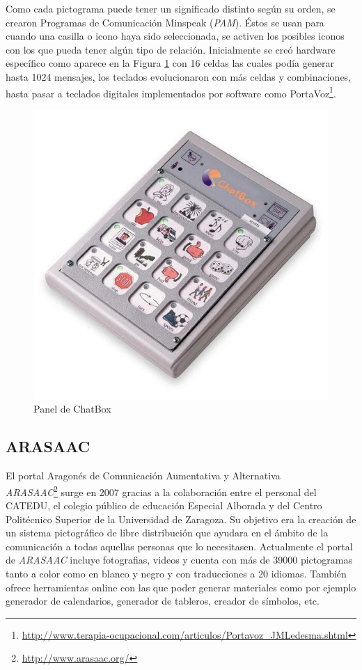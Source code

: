 Como cada pictograma puede tener un significado distinto según su orden, se crearon Programas de Comunicación Minspeak (\textit{PAM}). Éstos se usan para cuando una casilla o icono haya sido seleccionada, se activen los posibles iconos con los que pueda tener algún tipo de relación. Inicialmente se creó hardware específico como aparece en la Figura \ref{fig:chatbox} con 16 celdas las cuales podía generar hasta 1024 mensajes, los teclados evolucionaron con más celdas y combinaciones, hasta pasar a teclados digitales implementados por software como PortaVoz\footnote{\url{http://www.terapia-ocupacional.com/articulos/Portavoz_JMLedesma.shtml}}.

\begin{figure}[h!]
	\centering
	\includegraphics[width=0.4\linewidth]{Imagenes/Bitmap/ChatBox}
	\caption[ChatBox]{Panel de ChatBox}
	\label{fig:chatbox}
\end{figure}



\subsection{ARASAAC}

El portal Aragonés de Comunicación Aumentativa y Alternativa \\ \textit{ARASAAC}\footnote{\url{http://www.arasaac.org/}}
 surge en 2007 gracias a la colaboración entre el personal del CATEDU, el colegio público de educación Especial Alborada y del Centro Politécnico Superior de la Universidad de Zaragoza. Su objetivo era la creación de un sistema pictográfico de libre distribución que ayudara en el ámbito de la comunicación a todas aquellas personas que lo necesitasen.
Actualmente el portal de \textit{ARASAAC} incluye fotografias, videos y cuenta con más de 39000 pictogramas tanto a color como en blanco y negro y con traducciones a 20 idiomas. También ofrece herramientas online con las que poder generar materiales como por ejemplo generador de calendarios, generador de tableros, creador de símbolos, etc.

